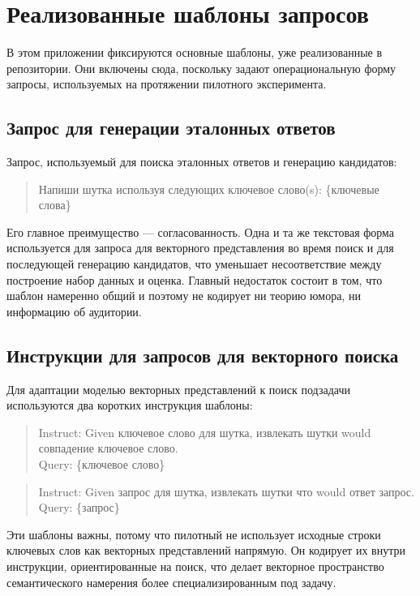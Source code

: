 \chapter{Реализованные шаблоны запросов}

В этом приложении фиксируются основные шаблоны, уже реализованные в репозитории. Они включены сюда, поскольку задают операциональную форму запросы, используемых на протяжении пилотного эксперимента.

\section{Запрос для генерации эталонных ответов}

Запрос, используемый для поиска эталонных ответов и генерацию кандидатов:
\begin{quote}
 \ttfamily
 Напиши шутка используя следующих ключевое слово(s): \{ключевые слова\}
\end{quote}

Его главное преимущество --- согласованность. Одна и та же текстовая форма используется для запроса для векторного представления во время поиск и для последующей генерацию кандидатов, что уменьшает несоответствие между построение набор данных и оценка. Главный недостаток состоит в том, что шаблон намеренно общий и поэтому не кодирует ни теорию юмора, ни информацию об аудитории.

\section{Инструкции для запросов для векторного поиска}

Для адаптации моделью векторных представлений к поиск подзадачи используются два коротких инструкция шаблоны:
\begin{quote}
 \ttfamily
 Instruct: Given ключевое слово для шутка, извлекать шутки would совпадение ключевое слово.\\
 Query: \{ключевое слово\}
\end{quote}

\begin{quote}
 \ttfamily
 Instruct: Given запрос для шутка, извлекать шутки что would ответ запрос.\\
 Query: \{запрос\}
\end{quote}

Эти шаблоны важны, потому что пилотный не использует исходные строки ключевых слов как векторных представлений напрямую. Он кодирует их внутри инструкции, ориентированные на поиск, что делает векторное пространство семантического намерения более специализированным под задачу.


